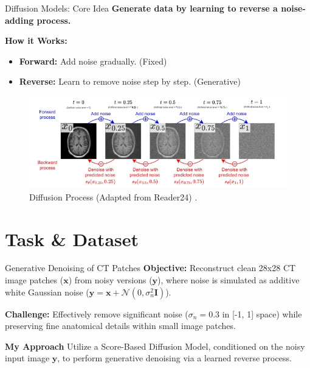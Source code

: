 \documentclass[10pt]{beamer}
\newcommand{\vect}[1]{\bm{#1}}
\begin{document}
\begin{frame}{Diffusion Models: Core Idea}
  \textbf{Generate data by learning to reverse a noise-adding process.}

  \medskip
  \textbf{How it Works:}
  \begin{itemize}
    \item \textbf{Forward:} Add noise gradually. (Fixed)
    \item \textbf{Reverse:} Learn to remove noise step by step. (Generative)
  \end{itemize}
    \begin{figure}
            \centering
            \includegraphics[width=\textwidth]{diff_mod.png}
            \caption{Diffusion Process (Adapted from Reader24) \cite{95846d1d06ff4241b5527fe62da68126}.}
        \end{figure}
\end{frame}

\section{Task \& Dataset}

\begin{frame}{Generative Denoising of CT Patches}
  \textbf{Objective:} Reconstruct clean 28x28 CT image patches ($\vect{x}$) from noisy versions ($\vect{y}$), where noise is simulated as additive white Gaussian noise ($\vect{y} = \vect{x} + \mathcal{N}(0, \sigma_n^2 \mathbf{I})$).

  \medskip
  \textbf{Challenge:} Effectively remove significant noise ($\sigma_n = 0.3$ in [-1, 1] space) while preserving fine anatomical details within small image patches.

  \medskip
  \textbf{My Approach} Utilize a \alert{Score-Based Diffusion Model}, conditioned on the noisy input image $\vect{y}$, to perform generative denoising via a learned reverse process.

\end{frame}
\end{document}
